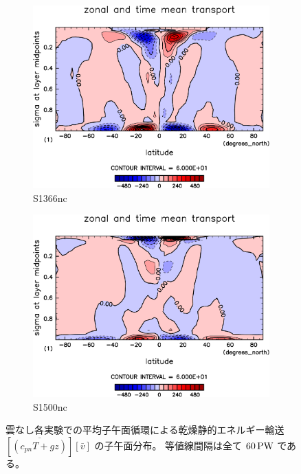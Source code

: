 \documentclass[body]{subfiles}
\begin{document}
\begin{figure}[t]
	\centering
	\begin{subfigure}{.4\textwidth}
		\centering
		\includegraphics[width=\textwidth]{S1366-nc/MeriHeatTransTest@dryStatEn_M,time=3650:4015-crop-rotate.pdf}
		\caption{S1366nc}\label{乾燥静的エネルギー平均子午面循環S1366nc}
	\end{subfigure}
	\begin{subfigure}{.4\textwidth}
		\centering
		\includegraphics[width=\textwidth]{S1500-nc/MeriHeatTransTest@dryStatEn_M,time=3650:4015-crop-rotate.pdf}
		\caption{S1500nc}\label{乾燥静的エネルギー平均子午面循環S1500nc}
	\end{subfigure}
	\caption[雲なし各実験での平均子午面循環による乾燥静的エネルギー輸送の子午面分布]{
		雲なし各実験での平均子午面循環による乾燥静的エネルギー輸送 \([\overline{(c_{pn}T+gz)}][\bar v]\) の子午面分布。
		等値線間隔は全て \(60\hmu{PW}\) である。
	}\label{乾燥静的エネルギー平均子午面循環nc}
\end{figure}
\end{document}
